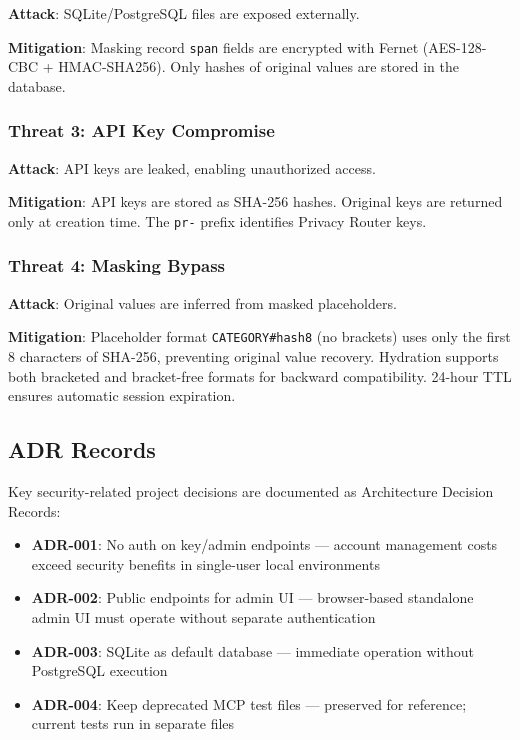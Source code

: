\documentclass[11pt,a4paper]{article}
\begin{document}
\textbf{Attack}: SQLite/PostgreSQL files are exposed externally.

\textbf{Mitigation}: Masking record \texttt{span} fields are encrypted with Fernet (AES-128-CBC + HMAC-SHA256). Only hashes of original values are stored in the database.

\subsubsection{Threat 3: API Key Compromise}

\textbf{Attack}: API keys are leaked, enabling unauthorized access.

\textbf{Mitigation}: API keys are stored as SHA-256 hashes. Original keys are returned only at creation time. The \texttt{pr-} prefix identifies Privacy Router keys.

\subsubsection{Threat 4: Masking Bypass}

\textbf{Attack}: Original values are inferred from masked placeholders.

\textbf{Mitigation}: Placeholder format \texttt{CATEGORY\#hash8} (no brackets) uses only the first 8 characters of SHA-256, preventing original value recovery. Hydration supports both bracketed and bracket-free formats for backward compatibility. 24-hour TTL ensures automatic session expiration.

\subsection{ADR Records}

Key security-related project decisions are documented as Architecture Decision Records:

\begin{itemize}[nosep]
  \item \textbf{ADR-001}: No auth on key/admin endpoints --- account management costs exceed security benefits in single-user local environments
  \item \textbf{ADR-002}: Public endpoints for admin UI --- browser-based standalone admin UI must operate without separate authentication
  \item \textbf{ADR-003}: SQLite as default database --- immediate operation without PostgreSQL execution
  \item \textbf{ADR-004}: Keep deprecated MCP test files --- preserved for reference; current tests run in separate files
\end{itemize}
\end{document}
